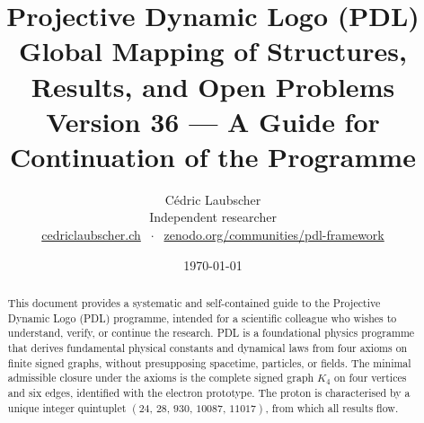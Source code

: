 \documentclass[11pt,a4paper]{article}
\title{Projective Dynamic Logo (PDL)\\[4pt]
\large Global Mapping of Structures, Results, and Open Problems\\[2pt]
\normalsize Version 36 --- A Guide for Continuation of the Programme}
\author{C\'edric Laubscher\\[4pt]
\small Independent researcher\\
\small \href{https://cedriclaubscher.ch}{cedriclaubscher.ch}
$\;\cdot\;$
\small \href{https://zenodo.org/communities/pdl-framework/}{zenodo.org/communities/pdl-framework}}
\date{\today}
\theoremstyle{plain}
\theoremstyle{definition}
\theoremstyle{remark}
\newcommand{\Kfour}{K_4}
\newcommand{\quintuplet}{(24,\,28,\,930,\,10087,\,11017)}
\begin{document}
\maketitle
\setcounter{tocdepth}{2}

\begin{abstract}
This document provides a systematic and self-contained guide to the Projective Dynamic Logo (PDL) programme, intended for a scientific colleague who wishes to understand, verify, or continue the research. PDL is a foundational physics programme that derives fundamental physical constants and dynamical laws from four axioms on finite signed graphs, without presupposing spacetime, particles, or fields. The minimal admissible closure under the axioms is the complete signed graph $\Kfour$ on four vertices and six edges, identified with the electron prototype. The proton is characterised by a unique integer quintuplet $\quintuplet$, from which all results flow.


\end{abstract}
\end{document}
